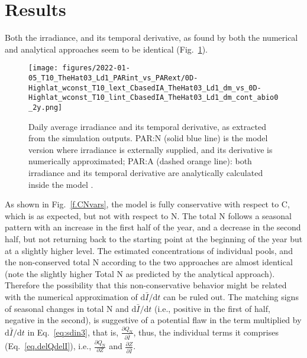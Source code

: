 \documentclass[gmd, manuscript, draft]{copernicus}
\begin{document}



\newpage

\section{Results}
Both the irradiance, and its temporal derivative, as found by both the numerical and analytical approaches seem to be identical (Fig.~\ref{f.I}).
\begin{figure}[ht!]
\texttt{[image: figures/2022-01-05\_T10\_TheHat03\_Ld1\_PARint\_vs\_PARext/0D-Highlat\_wconst\_T10\_lext\_CbasedIA\_TheHat03\_Ld1\_dm\_vs\_0D-Highlat\_wconst\_T10\_lint\_CbasedIA\_TheHat03\_Ld1\_dm\_cont\_abio0\_2y.png]}
\caption{Daily average irradiance and its temporal derivative, as extracted from the simulation outputs. PAR:N (solid blue line) is the model version where irradiance is externally supplied, and its derivative is numerically approximated; PAR:A (dashed orange line): both irradiance and its temporal derivative are analytically calculated inside the model . \label{f.I}}
\end{figure}

As shown in Fig.~\ref{f.CNvars}, the model is fully conservative with respect to C, which is as expected, but not with respect to N. The total N follows a seasonal pattern with an increase in the first half of the year, and a decrease in the second half, but not returning back to the starting point at the beginning of the year but at a slightly higher level. The estimated concentrations of individual pools, and the non-conserved total N according to the two approaches are almost identical (note the slightly higher Total N as predicted by the analytical approach). Therefore the possibility that this non-conservative behavior might be related with the numerical approximation of $\text{d}\bar{I}/\text{d}t$  can be ruled out. The matching signs of seasonal changes in total N and $\text{d}\bar{I}/\text{d}t$  (i.e., positive in the first of half, negative in the second), is suggestive of a potential flaw in the term multiplied by $\text{d}\bar{I}/\text{d}t$ in Eq.~\ref{eq:sdin3}, that is,  $\frac{\partial Q_\text{N}}{\partial \bar{I}}$, thus, the individual terms it comprises (Eq.~\ref{eq.delQdelI}), i.e., $\frac{\partial Q_\text{N}}{\partial Z}$ and $\frac{\partial Z}{\partial \bar{I}}$. 
\end{document}
